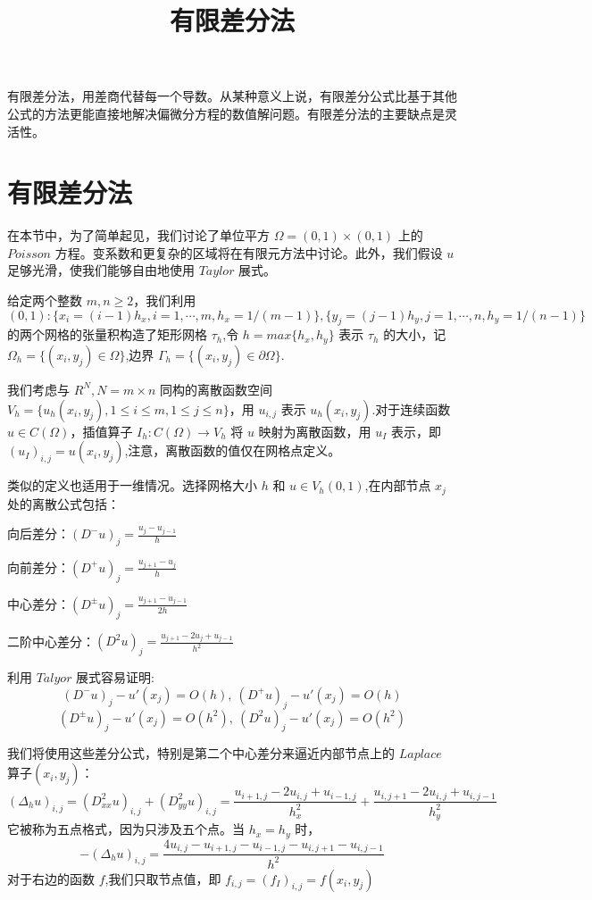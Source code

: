 \documentclass[12pt,a4paper]{article}
\title{有限差分法}
\date{\chntoday}
\begin{document}
\maketitle
有限差分法，用差商代替每一个导数。从某种意义上说，有限差分公式比基于其他公式的方法更能直接地解决偏微分方程的数值解问题。有限差分法的主要缺点是灵活性。

\section{有限差分法}
在本节中，为了简单起见，我们讨论了单位平方 $\Omega=(0,1)\times (0,1)$ 上的 $Poisson$ 方程。变系数和更复杂的区域将在有限元方法中讨论。此外，我们假设 $u$ 足够光滑，使我们能够自由地使用 $Taylor$ 展式。

给定两个整数 $m,n\ge 2$，我们利用 $(0,1):\lbrace x_i=(i-1)h_x,i=1,\cdots ,m,h_x=1/(m-1)\rbrace,\lbrace y_j=(j-1)h_y,j=1,\cdots ,n,h_y=1/(n-1)\rbrace$ 的两个网格的张量积构造了矩形网格 $\tau_h$,令 $h=max\lbrace h_x,h_y\rbrace$ 表示 $\tau_h$ 的大小，记 $\Omega_h=\lbrace (x_i,y_j)\in \Omega\rbrace$,边界 $\Gamma_h=\lbrace (x_i,y_j)\in \partial\Omega\rbrace$.

我们考虑与 $R^N,N=m\times n$ 同构的离散函数空间 $V_h=\lbrace u_h(x_i,y_j),1\le i\le m,1\le j\le n\rbrace$，用 $u_{i,j}$ 表示 $u_h(x_i,y_j)$.对于连续函数 $u\in C(\Omega)$，插值算子 $I_h:C(\Omega)\rightarrow V_h$ 将 $u$ 映射为离散函数，用 $u_I$ 表示，即 $(u_I)_{i,j}=u(x_i,y_j)$,注意，离散函数的值仅在网格点定义。

类似的定义也适用于一维情况。选择网格大小 $h$ 和 $u\in V_h(0,1)$,在内部节点 $x_j$ 处的离散公式包括：

向后差分：$(D^-u)_j=\frac{u_j-u_{j-1}}{h}$

向前差分：$(D^+u)_j=\frac{u_{j+1}-u_j}{h}$

中心差分：$(D^\pm u)_j=\frac{u_{j+1}-u_{j-1}}{2h}$

二阶中心差分：$(D^2 u)_j=\frac{u_{j+1}-2u_j+u_{j-1}}{h^2}$

利用 $Talyor$ 展式容易证明:
$$
(D^-u)_j-u'(x_j)=O(h),~(D^+u)_j-u'(x_j)=O (h)
$$
$$
(D^\pm u)_j-u'(x_j)=O (h^2),~(D^2 u)_j-u'(x_j)=O (h^2)
$$

我们将使用这些差分公式，特别是第二个中心差分来逼近内部节点上的 $Laplace$ 算子$(x_i,y_j)$：
$$
(\Delta _h u)_{i,j}=(D^2_{xx}u)_{i,j}+(D^2_{yy}u)_{i,j}= \frac{u_{i+1,j}-2u_{i,j}+u_{i-1,j}}{h^2_x}+\frac{u_{i,j+1}-2u_{i,j}+u_{i,j-1}}{h^2_y} 
$$
它被称为五点格式，因为只涉及五个点。当 $h_x=h_y$ 时，
\begin{equation}
-(\Delta _h u)_{i,j}=\frac{4u_{i,j}-u_{i+1,j}-u_{i-1,j}-u_{i,j+1}-u_{i,j-1}}{h^2} 
\end{equation}
对于右边的函数 $f$,我们只取节点值，即 $f_{i,j}=(f_I)_{i,j}=f(x_i,y_j)$
\end{document}

